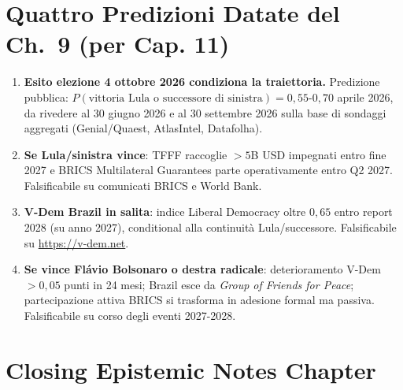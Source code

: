 \section{Quattro Predizioni Datate del Ch.~9 (per Cap.
11)}\label{quattro-predizioni-datate-del-cap.-9-per-cap.-11}

\begin{enumerate}
\def\labelenumi{\arabic{enumi}.}
\tightlist
\item
  \textbf{Esito elezione 4 ottobre 2026 condiziona la traiettoria.}
  Predizione pubblica:
  \(P(\text{vittoria Lula o successore di sinistra}) = 0{,}55\)-\(0{,}70\)
  aprile 2026, da rivedere al 30 giugno 2026 e al 30 settembre 2026
  sulla base di sondaggi aggregati (Genial/Quaest, AtlasIntel,
  Datafolha).
\item
  \textbf{Se Lula/sinistra vince}: TFFF raccoglie \(> 5\)B USD impegnati
  entro fine 2027 e BRICS Multilateral Guarantees parte operativamente
  entro Q2 2027. Falsificabile su comunicati BRICS e World Bank.
\item
  \textbf{V-Dem Brazil in salita}: indice Liberal Democracy oltre
  \(0{,}65\) entro report 2028 (su anno 2027), conditional alla
  continuità Lula/successore. Falsificabile su \url{https://v-dem.net}.
\item
  \textbf{Se vince Flávio Bolsonaro o destra radicale}: deterioramento
  V-Dem \(> 0{,}05\) punti in 24 mesi; Brazil esce da \emph{Group of
  Friends for Peace}; partecipazione attiva BRICS si trasforma in
  adesione formal ma passiva. Falsificabile su corso degli eventi
  2027-2028.
\end{enumerate}



\section{Closing Epistemic Notes
Chapter}\label{note-epistemiche-di-chiusura-chapter}

